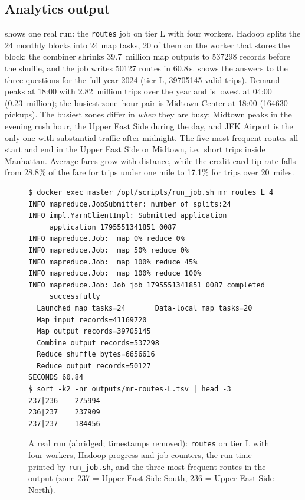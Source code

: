 \subsection{Analytics output}
 shows one real run: the \texttt{routes} job on tier L with four
workers. Hadoop splits the 24 monthly blocks into 24 map tasks, 20 of them on the
worker that stores the block; the combiner shrinks 39.7~million map outputs to
\num{537298} records before the shuffle, and the job writes \num{50127} routes in
60.8\,s.  shows the answers to the three questions for the full year 2024
(tier L, \num{39705145} valid trips). Demand peaks at 18:00 with 2.82~million trips
over the year and is lowest at 04:00 (0.23~million); the busiest zone--hour pair is
Midtown Center at 18:00 (\num{164630} pickups). The busiest zones differ in
\emph{when} they are busy: Midtown peaks in the evening rush hour, the Upper East Side
during the day, and JFK Airport is the only one with substantial traffic after
midnight. The five most frequent routes all start and end in the Upper East Side or
Midtown, i.e.\ short trips inside Manhattan. Average fares grow with distance, while
the credit-card tip rate falls from 28.8\% of the fare for trips under one mile to
17.1\% for trips over 20~miles.

\begin{figure}[t]
\begin{lstlisting}[style=terminal]
$ docker exec master /opt/scripts/run_job.sh mr routes L 4
INFO mapreduce.JobSubmitter: number of splits:24
INFO impl.YarnClientImpl: Submitted application
     application_1795551341851_0087
INFO mapreduce.Job:  map 0% reduce 0%
INFO mapreduce.Job:  map 50% reduce 0%
INFO mapreduce.Job:  map 100% reduce 45%
INFO mapreduce.Job:  map 100% reduce 100%
INFO mapreduce.Job: Job job_1795551341851_0087 completed
     successfully
  Launched map tasks=24       Data-local map tasks=20
  Map input records=41169720
  Map output records=39705145
  Combine output records=537298
  Reduce shuffle bytes=6656616
  Reduce output records=50127
SECONDS 60.84
$ sort -k2 -nr outputs/mr-routes-L.tsv | head -3
237|236    275994
236|237    237909
237|237    184456
\end{lstlisting}
\caption{A real run (abridged; timestamps removed): \texttt{routes} on tier L with
four workers, Hadoop progress and job counters, the run time printed by
\texttt{run\_job.sh}, and the three most frequent routes in the output
(zone 237 = Upper East Side South, 236 = Upper East Side North).}\label{fig:run}
\end{figure}


